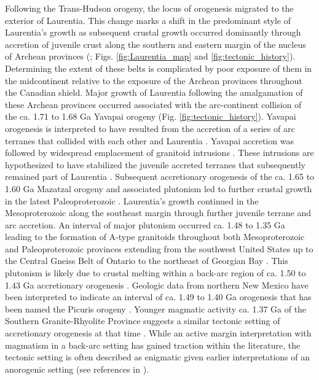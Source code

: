 \documentclass[11pt,letterpaper]{article}
\begin{document}
Following the Trans-Hudson orogeny, the locus of orogenesis migrated to the exterior of Laurentia. This change marks a shift in the predominant style of Laurentia's growth as subsequent crustal growth occurred dominantly through accretion of juvenile crust along the southern and eastern margin of the nucleus of Archean provinces (\citealp{Whitmeyer2007a}; Figs. \ref{fig:Laurentia_map} and \ref{fig:tectonic_history}). Determining the extent of these belts is complicated by poor exposure of them in the midcontinent relative to the exposure of the Archean provinces throughout the Canadian shield. Major growth of Laurentia following the amalgamation of these Archean provinces occurred associated with the arc-continent collision of the ca. 1.71 to 1.68 Ga Yavapai orogeny (Fig. \ref{fig:tectonic_history}). Yavapai orogenesis is interpreted to have resulted from the accretion of a series of arc terranes that collided with each other and Laurentia \citep{Karlstrom2001a}. Yavapai accretion was followed by widespread emplacement of granitoid intrusions \citep{Whitmeyer2007a}. These intrusions are hypothesized to have stabilized the juvenile accreted terranes that subsequently remained part of Laurentia \citep{Whitmeyer2007a}. Subsequent accretionary orogenesis of the ca. 1.65 to 1.60 Ga Mazatzal orogeny and associated plutonism led to further crustal growth in the latest Paleoproterozoic \citep{Karlstrom1988a}. Laurentia's growth continued in the Mesoproterozoic along the southeast margin through further juvenile terrane and arc accretion. An interval of major plutonism occurred ca. 1.48 to 1.35 Ga leading to the formation of A-type granitoids throughout both Mesoproterozoic and Paleoproterozoic provinces extending from the southwest United States up to the Central Gneiss Belt of Ontario to the northeast of Georgian Bay \citep{Slagstad2009a}. This plutonism is likely due to crustal melting within a back-arc region of ca. 1.50 to 1.43 Ga accretionary orogenesis \citep{Bickford2015a}. Geologic data from northern New Mexico have been interpreted to indicate an interval of ca. 1.49 to 1.40 Ga orogenesis that has been named the Picuris orogeny \citep{Daniel2013a}. Younger magmatic activity ca. 1.37 Ga of the Southern Granite-Rhyolite Province suggests a similar tectonic setting of accretionary orogenesis at that time \citep{Bickford2015a}. While an active margin interpretation with magmatism in a back-arc setting has gained traction within the literature, the tectonic setting is often described as enigmatic given earlier interpretations of an anorogenic setting (see references in \citealp{Slagstad2009a}).
\end{document}
